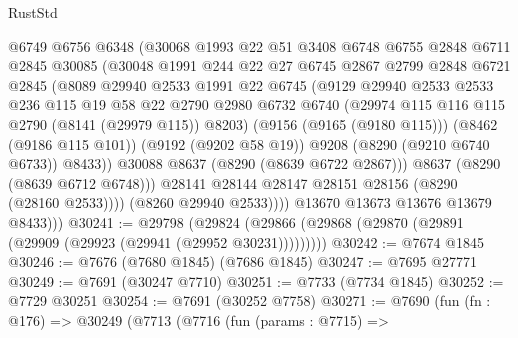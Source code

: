 \begin{lexlean}{RustStd}
\begin{coremodule}
                    @6749
                    @6756
                    @6348
                    (@30068
                      @1993
                      @22
                      @51
                      @3408
                      @6748
                      @6755
                      @2848
                      @6711
                      @2845
                      @30085
                      (@30048
                        @1991
                        @244
                        @22
                        @27
                        @6745
                        @2867
                        @2799
                        @2848
                        @6721
                        @2845
                        (@8089
                          @29940
                          @2533
                          @1991
                          @22
                          @6745
                          (@9129
                            @29940
                            @2533
                            @2533
                            @236
                            @115
                            @19
                            @58
                            @22
                            @2790
                            @2980
                            @6732
                            @6740
                            (@29974 @115 @116 @115 @2790 (@8141 (@29979 @115)) @8203)
                            (@9156 (@9165 (@9180 @115)))
                            (@8462 (@9186 @115 @101))
                            (@9192 (@9202 @58 @19))
                            @9208
                            (@8290 (@9210 @6740 @6733))
                            @8433))
                        @30088
                        @8637
                        (@8290 (@8639 @6722 @2867)))
                      @8637
                      (@8290 (@8639 @6712 @6748)))
                    @28141
                    @28144
                    @28147
                    @28151
                    @28156
                    (@8290 (@28160 @2533))))
                (@8260 @29940 @2533))))
          @13670
          @13673
          @13676
          @13679
          @8433)))
@30241 := @29798
    (@29824 (@29866 (@29868 (@29870 (@29891 (@29909 (@29923 (@29941 (@29952 @30231)))))))))
@30242 := @7674 @1845
@30246 := @7676 (@7680 @1845) (@7686 @1845)
@30247 := @7695 @27771
@30249 := @7691 (@30247 @7710)
@30251 := @7733 (@7734 @1845)
@30252 := @7729 @30251
@30254 := @7691 (@30252 @7758)
@30271 := @7690
    (fun (fn : @176) =>
    @30249
      (@7713
        (@7716
          (fun (params : @7715) =>

\end{coremodule}
\end{lexlean}

